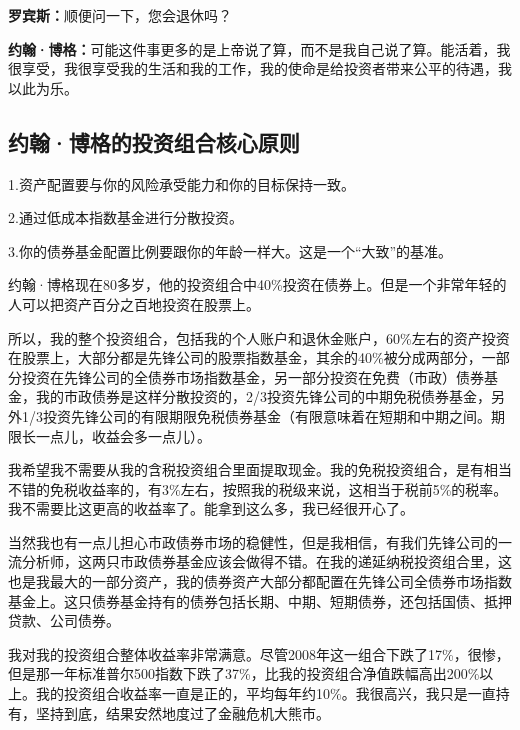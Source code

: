 \begin{BookQuote}
\textbf{罗宾斯：}顺便问一下，您会退休吗？
\end{BookQuote}

\begin{BookQuote}
\textbf{约翰·博格：}可能这件事更多的是上帝说了算，而不是我自己说了算。能活着，我很享受，我很享受我的生活和我的工作，我的使命是给投资者带来公平的待遇，我以此为乐。
\end{BookQuote}

\subsection{约翰·博格的投资组合核心原则}

1.资产配置要与你的风险承受能力和你的目标保持一致。

2.通过低成本指数基金进行分散投资。

3.你的债券基金配置比例要跟你的年龄一样大。这是一个“大致”的基准。

约翰·博格现在80多岁，他的投资组合中40\%投资在债券上。但是一个非常年轻的人可以把资产百分之百地投资在股票上。

所以，我的整个投资组合，包括我的个人账户和退休金账户，60\%左右的资产投资在股票上，大部分都是先锋公司的股票指数基金，其余的40\%被分成两部分，一部分投资在先锋公司的全债券市场指数基金，另一部分投资在免费（市政）债券基金，我的市政债券是这样分散投资的，2/3投资先锋公司的中期免税债券基金，另外1/3投资先锋公司的有限期限免税债券基金（有限意味着在短期和中期之间。期限长一点儿，收益会多一点儿）。

我希望我不需要从我的含税投资组合里面提取现金。我的免税投资组合，是有相当不错的免税收益率的，有3\%左右，按照我的税级来说，这相当于税前5\%的税率。我不需要比这更高的收益率了。能拿到这么多，我已经很开心了。

当然我也有一点儿担心市政债券市场的稳健性，但是我相信，有我们先锋公司的一流分析师，这两只市政债券基金应该会做得不错。在我的递延纳税投资组合里，这也是我最大的一部分资产，我的债券资产大部分都配置在先锋公司全债券市场指数基金上。这只债券基金持有的债券包括长期、中期、短期债券，还包括国债、抵押贷款、公司债券。

我对我的投资组合整体收益率非常满意。尽管2008年这一组合下跌了17\%，很惨，但是那一年标准普尔500指数下跌了37\%，比我的投资组合净值跌幅高出200\%以上。我的投资组合收益率一直是正的，平均每年约10\%。我很高兴，我只是一直持有，坚持到底，结果安然地度过了金融危机大熊市。
